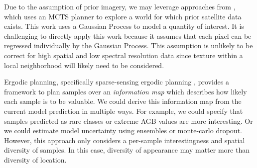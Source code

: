 Due to the assumption of prior imagery, we may leverage approaches from \cite{Candela2021}, which uses an MCTS planner to explore a world for which prior satellite data exists. This work uses a Gaussian Process to model a quantity of interest. It is challenging to directly apply this work because it assumes that each pixel can be regressed individually by the Gaussian Process. This assumption is unlikely to be correct for high spatial and low spectral resolution data since texture within a local neighborhood will likely need to be considered.

Ergodic planning, specifically sparse-sensing ergodic planning \cite{ergodic}, provides a framework to plan samples over an \textit{information map} which describes how likely each sample is to be valuable. We could derive this information map from the current model prediction in multiple ways. For example, we could specify that samples predicted as rare classes or extreme AGB values are more interesting. Or we could estimate model uncertainty using ensembles or monte-carlo dropout. However, this approach only considers a per-sample interestingness and spatial diversity of samples. In this case, diversity of appearance may matter more than diversity of location. 


